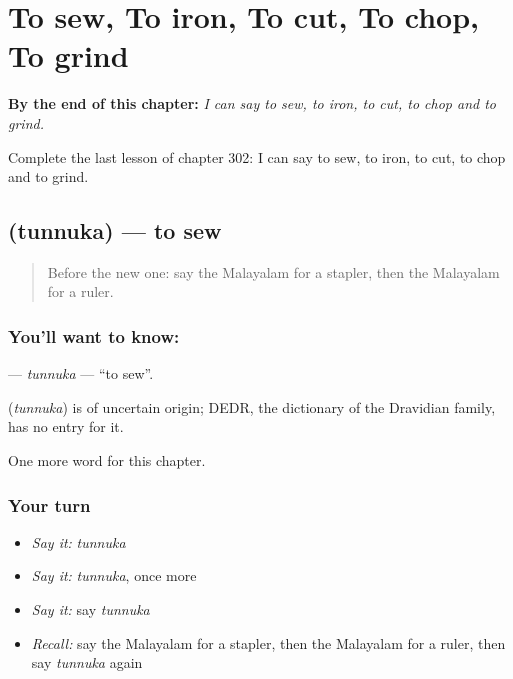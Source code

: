 
\chapter{To sew, To iron, To cut, To chop, To grind}
\label{ch:ml-to-sew-to-iron-to-cut-to-chop-to-grind}

\begin{chapteropening}
\textbf{By the end of this chapter:} \emph{I can say to sew, to iron, to cut, to chop and to grind.}

Complete the last lesson of chapter 302: I can say to sew, to iron, to cut, to chop and to grind.
\end{chapteropening}

\section[\texorpdfstring{\ml{തുന്നുക} (tunnuka)}{തുന്നുക (tunnuka)}]{ (tunnuka) — to sew}

\label{lesson:ML-C302-tunnuka}



\begin{quote}
Before the new one: say the Malayalam for a stapler, then the Malayalam for a ruler.
\end{quote}

\subsection*{You'll want to know: }
\textbf{} — \emph{tunnuka} — \textquotedblleft{}to sew\textquotedblright{}.

\begin{cousinweb}
\textbf{} (\emph{tunnuka}) is of uncertain origin; DEDR, the dictionary of the Dravidian family, has no entry for it.
\end{cousinweb}

\begin{grammarlens}[title={What you've built}]
One more word for this chapter.
\end{grammarlens}

\subsection*{Your turn}
\begin{itemize}
\raggedright
  \item \emph{Say it:} \emph{tunnuka}
  \item \emph{Say it:} \emph{tunnuka}, once more
  \item \emph{Say it:} say \emph{tunnuka}
  \item \emph{Recall:} say the Malayalam for a stapler, then the Malayalam for a ruler, then say \emph{tunnuka} again
\end{itemize}

